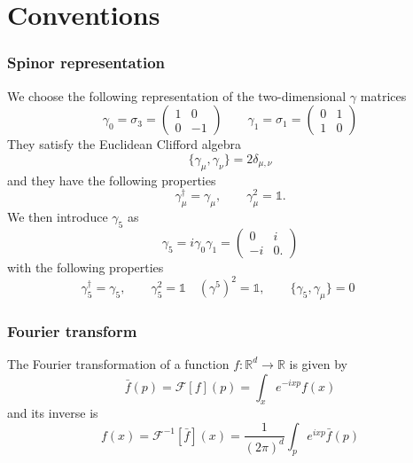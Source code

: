  
\chapter{Conventions} %
\label{chap:AppendixA} %
\subsection*{Spinor representation}
We choose the following representation of the two-dimensional $\gamma$ matrices
\begin{equation*}
        \gamma_0 = \sigma_3 = 
        \begin{pmatrix}
            1 & 0 \\
            0 & -1    
        \end{pmatrix}
        \qquad 
        \gamma_1 = \sigma_1 = 
        \begin{pmatrix}
            0 & 1 \\
            1 & 0    
        \end{pmatrix}
\end{equation*}
They satisfy the Euclidean Clifford algebra
\begin{equation*}
    \{\gamma_\mu, \gamma_\nu\} = 2\delta_{\mu, \nu}
\end{equation*}
and they have the following properties
\begin{equation*}
    \gamma_\mu^{\dagger}=\gamma_\mu, \quad  \quad \gamma_\mu^2=\mathbb{1}.
\end{equation*}
We then introduce $\gamma_5$ as
\begin{equation*}
    \gamma_5 = i \gamma_0 \gamma_1 =
    \begin{pmatrix}
        0 & i \\
        -i & 0. 
    \end{pmatrix}
\end{equation*}
with the following properties
\begin{equation*} 
    \gamma_5^{\dagger}=\gamma_5, \qquad \gamma_5^2=\mathbb{1} \quad
    (\gamma^5)^2 = \mathbb{1}, \qquad \{\gamma_5, \gamma_\mu\} = 0 \qquad 
\end{equation*}



\subsection*{Fourier transform}
The Fourier transformation of a function $f: \mathbb{R}^d \rightarrow \mathbb{R}$ is given by
$$
\bar{f}(p)=\mathcal{F}[f](p)=\int_x e^{-ixp} f(x)
$$
and its inverse is
$$
f(x)=\mathcal{F}^{-1}[\bar{f}](x)=\frac{1}{(2 \pi)^d} \int_p e^{ixp} \bar{f}(p)
$$

